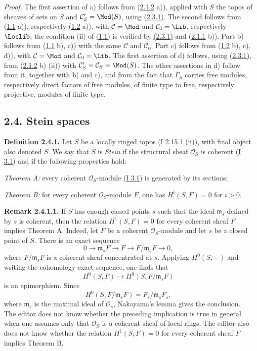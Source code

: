\emph{Proof.} The first assertion of a) follows from (\hyperlink{sga6.e02.lem.2-1-2}{2.1.2} a)), applied with $S$ the topos of sheaves of sets on $S$ and $\mathcal C'_S=\Mod(S)$, using \hyperlink{sga6.e02.para.2-3-1}{(2.3.1)}. The second follows from (\hyperlink{sga6.e02.prop.1-1}{1.1} a)), respectively (\hyperlink{sga6.e02.prop.1-2}{1.2} a)), with $\mathcal C=\Mod$ and $\mathcal C_0=\Lib$, respectively $\Loclib$; the condition (ii) of \hyperlink{sga6.e02.prop.1-1}{(1.1)} is verified by \hyperlink{sga6.e02.para.2-3-1}{(2.3.1)} and (\hyperlink{sga6.e02.lem.2-1-1}{2.1.1} b)). Part b) follows from (\hyperlink{sga6.e02.prop.1-1}{1.1} b), c)) with the same $\mathcal C$ and $\mathcal C_0$. Part c) follows from (\hyperlink{sga6.e02.prop.1-2}{1.2} b), c), d)), with $\mathcal C=\Mod$ and $\mathcal C_0=\Lib$. The first assertion of d) follows, using \hyperlink{sga6.e02.para.2-3-1}{(2.3.1)}, from (\hyperlink{sga6.e02.lem.2-1-2}{2.1.2} b) (ii)) with $\mathcal C'_S=\mathcal C_S=\Mod(S)$. The other assertions in d) follow from it, together with b) and c), and from the fact that $\Gamma_S$ carries free modules, respectively direct factors of free modules, of finite type to free, respectively projective, modules of finite type.

\subsection*{2.4. Stein spaces}

\textbf{Definition 2.4.1.} Let $S$ be a locally ringed topos (\hyperlink{sga6.e01.lem.2-15-1}{I 2.15.1 (ii)}), with final object also denoted $S$. We say that $S$ is \emph{Stein} if the structural sheaf $\mathcal O_S$ is coherent (\hyperlink{sga6.e01.def.3-1}{I 3.1}) and if the following properties hold:

\emph{Theorem A:} every coherent $\mathcal O_S$-module (\hyperlink{sga6.e01.def.3-1}{I 3.1}) is generated by its sections;

\emph{Theorem B:} for every coherent $\mathcal O_S$-module $F$, one has $H^i(S,F)=0$ for $i>0$.

\textbf{Remark 2.4.1.1.} If $S$ has enough closed points $s$ such that the ideal $\mathfrak m_s$ defined by $s$ is coherent, then the relation $H^1(S,F)=0$ for every coherent sheaf $F$ implies Theorem A. Indeed, let $F$ be a coherent $\mathcal O_S$-module and let $s$ be a closed point of $S$. There is an exact sequence
\[
0\longrightarrow \mathfrak m_sF\longrightarrow F\longrightarrow F/\mathfrak m_sF\longrightarrow0,
\]
where $F/\mathfrak m_sF$ is a coherent sheaf concentrated at $s$. Applying $H^0(S,-)$ and writing the cohomology exact sequence, one finds that
\[
H^0(S,F)\longrightarrow H^0(S,F/\mathfrak m_sF)
\]
is an epimorphism. Since
\[
H^0(S,F/\mathfrak m_sF)=F_s/\mathfrak m_sF_s,
\]
where $\mathfrak m_s$ is the maximal ideal of $\mathcal O_s$, Nakayama's lemma gives the conclusion. The editor does not know whether the preceding implication is true in general when one assumes only that $\mathcal O_S$ is a coherent sheaf of local rings. The editor also does not know whether the relation $H^1(S,F)=0$ for every coherent sheaf $F$ implies Theorem B.

